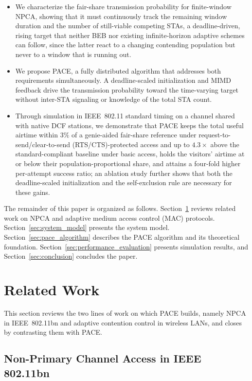 \documentclass[a4paper,fleqn]{cas-dc}
\begin{document}
\begin{itemize}
  \item We characterize the fair-share transmission probability for finite-window NPCA, showing that it must continuously track the remaining window duration and the number of still-viable competing STAs, a deadline-driven, rising target that neither BEB nor existing infinite-horizon adaptive schemes can follow, since the latter react to a changing contending population but never to a window that is running out.
  \item We propose PACE, a fully distributed algorithm that addresses both requirements simultaneously. A deadline-scaled initialization and MIMD feedback drive the transmission probability toward the time-varying target without inter-STA signaling or knowledge of the total STA count.
  \item Through simulation in IEEE~802.11 standard timing on a channel shared with native DCF stations, we demonstrate that PACE keeps the total useful airtime within $3\%$ of a genie-aided fair-share reference under request-to-send/clear-to-send (RTS/CTS)-protected access and up to $4.3\times$ above the standard-compliant baseline under basic access, holds the visitors' airtime at or below their population-proportional share, and attains a four-fold higher per-attempt success ratio; an ablation study further shows that both the deadline-scaled initialization and the self-exclusion rule are necessary for these gains.
\end{itemize}


The remainder of this paper is organized as follows. Section~\ref{sec:related_work} reviews related work on NPCA and adaptive medium access control (MAC) protocols. Section~\ref{sec:system_model} presents the system model. Section~\ref{sec:pace_algorithm} describes the PACE algorithm and its theoretical foundation. Section~\ref{sec:performance_evaluation} presents simulation results, and Section~\ref{sec:conclusion} concludes the paper.

\section{Related Work}
\label{sec:related_work}

This section reviews the two lines of work on which PACE builds, namely
NPCA in IEEE~802.11bn and adaptive contention control in wireless LANs, and
closes by contrasting them with PACE.

\subsection{Non-Primary Channel Access in IEEE 802.11bn}
\end{document}
